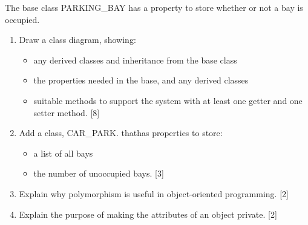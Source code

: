 The base class PARKING\_BAY has a property to store whether or not
a bay is occupied. 
\begin{enumerate}
\item Draw a class diagram, showing:
\begin{itemize}
\item any derived classes and inheritance from the base class
\item the properties needed in the base, and any derived classes
\item suitable methods to support the system with at least one getter and
one setter method. \hfill{}{[}8{]}
\end{itemize}
\item Add a class, CAR\_PARK. thathas properties to store:
\begin{itemize}
\item a list of all bays
\item the number of unoccupied bays. \hfill{}{[}3{]}
\end{itemize}
\item Explain why polymorphism is useful in object-oriented programming.
\hfill{}{[}2{]}
\item Explain the purpose of making the attributes of an object private.
\hfill{}{[}2{]}
\end{enumerate}